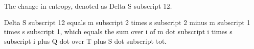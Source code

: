 The change in entropy, denoted as Delta S subscript 12.

Delta S subscript 12 equals m subscript 2 times s subscript 2 minus m subscript 1 times s subscript 1, which equals the sum over i of m dot subscript i times s subscript i plus Q dot over T plus S dot subscript tot.